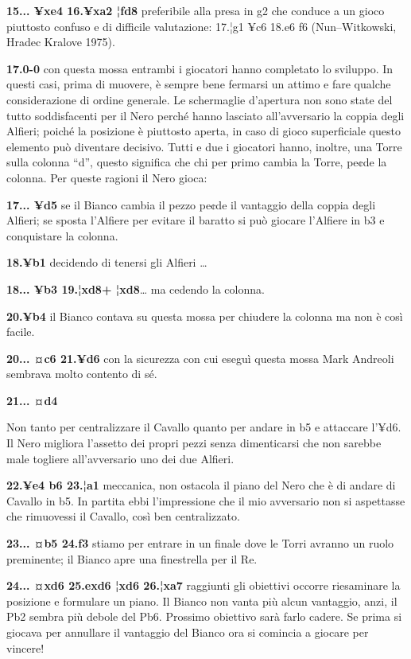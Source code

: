 \textbf{15... ¥xe4 16.¥xa2 ¦fd8} preferibile alla presa in g2 che
conduce a un gioco piuttosto confuso e di difficile valutazione: 17.¦g1
¥c6 18.e6 f6 (Nun--Witkowski, Hradec Kralove 1975).

\textbf{17.0-0} con questa mossa entrambi i giocatori hanno completato
lo sviluppo. In questi casi, prima di muovere, è sempre bene fermarsi un
attimo e fare qualche considerazione di ordine generale. Le schermaglie
d'apertura non sono state del tutto soddisfacenti per il Nero perché
hanno lasciato all'avversario la coppia degli Alfieri; poiché la
posizione è piuttosto aperta, in caso di gioco superficiale questo
elemento può diventare decisivo. Tutti e due i giocatori hanno, inoltre,
una Torre sulla colonna ``d'', questo significa che chi per primo cambia
la Torre, pe¢de la colonna. Per queste ragioni il Nero gioca:

\textbf{17... ¥d5} se il Bianco cambia il pezzo pe¢de il vantaggio della
coppia degli Alfieri; se sposta l'Alfiere per evitare il baratto si può
giocare l'Alfiere in b3 e conquistare la colonna.

\textbf{18.¥b1} decidendo di tenersi gli Alfieri \ldots{}

\textbf{18... ¥b3 19.¦xd8+ ¦xd8}\ldots{} ma cedendo la colonna.

\textbf{20.¥b4} il Bianco contava su questa mossa per chiudere la
colonna ma non è così facile.

\textbf{20... ¤c6 21.¥d6} con la sicurezza con cui eseguì questa mossa
Mark Andreoli sembrava molto contento di sé.

\textbf{21... ¤d4}


Non tanto per centralizzare il Cavallo quanto per andare in b5 e
attaccare l'¥d6. Il Nero migliora l'assetto dei propri pezzi senza
dimenticarsi che non sarebbe male togliere all'avversario uno dei due
Alfieri.

\textbf{22.¥e4 b6 23.¦a1} meccanica, non ostacola il piano del Nero che
è di andare di Cavallo in b5. In partita ebbi l'impressione che il mio
avversario non si aspettasse che rimuovessi il Cavallo, così ben
centralizzato.

\textbf{23... ¤b5 24.f3} stiamo per entrare in un finale dove le Torri
avranno un ruolo preminente; il Bianco apre una finestrella per il Re.

\textbf{24... ¤xd6 25.exd6 ¦xd6 26.¦xa7} raggiunti gli obiettivi occorre
riesaminare la posizione e formulare un piano. Il Bianco non vanta più
alcun vantaggio, anzi, il Pb2 sembra più debole del Pb6. Prossimo
obiettivo sarà farlo cadere. Se prima si giocava per annullare il
vantaggio del Bianco ora si comincia a giocare per vincere!

